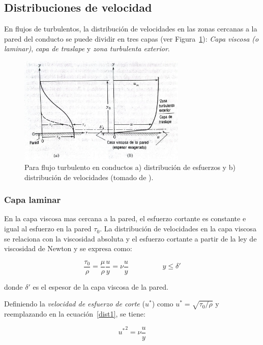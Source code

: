 \documentclass[11pt, oneside]{article}
\begin{document}
\subsection{Distribuciones de velocidad} %
En flujos de turbulentos, la distribuci\'on de velocidades en las zonas cercanas a la pared del conducto se puede dividir en tres capas (ver Figura~\ref{distr}): \emph{Capa viscosa (o laminar)}, \emph{capa de traslape} y \emph{zona turbulenta exterior}. 

\begin{figure}[h]
\centering
\includegraphics[width=8cm]{distr.jpeg}
\caption{Para flujo turbulento en conductos a) distribuci\'on de esfuerzos y b) distribuci\'on de velocidades (tomado de \cite{streeter}).}
\label{distr}
\end{figure}


\subsubsection*{Capa laminar} %
En la capa viscosa mas cercana a la pared, el esfuerzo cortante es constante e igual al esfuerzo en la pared $\tau_0$. La distribuci\'on de velocidades en la capa viscosa se relaciona con la viscosidad absoluta y el esfuerzo cortante a partir de la ley de viscosidad de Newton  y se expresa como:

\begin{equation}
\frac{\tau_0 }{\rho} = \frac{\mu}{\rho}\frac{u}{y} = \nu \frac{u}{y} \hspace{2cm} y \leq \delta'
\label{dist1}
\end{equation}

donde $\delta '$ es el espesor de la capa viscosa de la pared.

Definiendo la \emph{velocidad de esfuerzo de corte} ($u^*$) como $u^*=\sqrt{\tau_0 / \rho}$ y reemplazando en la ecuaci\'on~\ref{dist1}, se tiene:

\begin{equation}
{u^* }^2 = \nu \frac{u}{y}
\label{dist2}
\end{equation}
\end{document}
